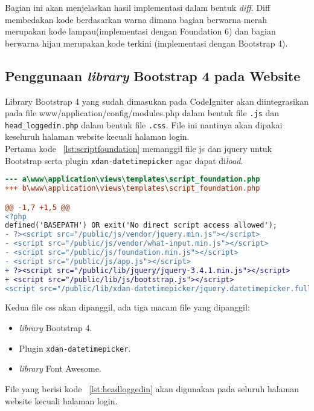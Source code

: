 Bagian ini akan menjelaskan hasil implementasi dalam bentuk \textit{diff}. Diff membedakan kode berdasarkan warna dimana bagian berwarna merah merupakan kode lampau(implementasi dengan Foundation 6) dan bagian berwarna hijau merupakan kode terkini  (implementasi dengan Bootstrap 4).
   
\subsection{Penggunaan \textit{library} Bootstrap 4 pada Website}

Library Bootstrap 4 yang sudah dimasukan pada CodeIgniter akan diintegrasikan pada file www/application/config/modules.php dalam bentuk file \texttt{.js} dan \texttt{head\_loggedin.php} dalam bentuk file \texttt{.css}. File ini nantinya akan dipakai keseluruh halaman website kecuali halaman login.\\

Pertama kode ~\ref{lst:scriptfoundation} memanggil file js dan jquery untuk Bootstrap serta plugin \texttt{xdan-datetimepicker} agar dapat di\textit{load}. \\

\begin{lstlisting}[language=diff, caption=Penambahan \path{\views\templates\script_foundation.php},  basicstyle=\ttfamily, frame=single,
columns=fullflexible, keepspaces=true, breaklines=true, label={lst:scriptfoundation}]
--- a\www\application\views\templates\script_foundation.php		
+++ b\www\application\views\templates\script_foundation.php	

@@ -1,7 +1,5 @@
<?php
defined('BASEPATH') OR exit('No direct script access allowed');
- ?><script src="/public/js/vendor/jquery.min.js"></script>
- <script src="/public/js/vendor/what-input.min.js"></script>
- <script src="/public/js/foundation.min.js"></script>
- <script src="/public/js/app.js"></script>
+ ?><script src="/public/lib/jquery/jquery-3.4.1.min.js"></script>
+ <script src="/public/lib/js/bootstrap.js"></script>
<script src="/public/lib/xdan-datetimepicker/jquery.datetimepicker.full.min.js"></script>
\end{lstlisting}

Kedua file css akan dipanggil, ada tiga macam file yang dipanggil: 
\begin{itemize}
	\item \textit{library} Bootstrap 4.
	\item Plugin \texttt{xdan-datetimepicker}.
	\item \textit{library} Font Awesome.
\end{itemize}
File yang berisi kode ~\ref{lst:headloggedin} akan digunakan pada seluruh halaman website kecuali halaman login.
 
